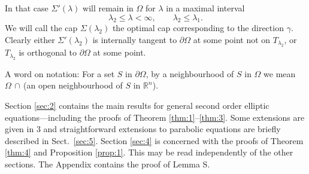 In that case $\Sigma'(\lambda)$ will remain in $\Omega$ for $\lambda$ in a maximal interval
\[\lambda_2\leq\lambda<\infty,\qquad \lambda_2\leq\lambda_1.\]
We will call the cap $\Sigma(\lambda_2)$ the optimal cap corresponding to the direction $\gamma$. 
Clearly either $\Sigma'(\lambda_2)$ is internally tangent to $\partial\Omega$ 
at some point not on $T_{\lambda_2}$, or $T_{\lambda_2}$ is orthogonal to
$\partial\Omega$ at some point.

A word on notation: For a set $S$ in $\partial\Omega$, by a neighbourhood of $S$ in $\Omega$
we mean $\Omega\,\cap$\,(an open neighbourhood of $S$ in $\mathbb{R}^n$).

Section \ref{sec:2} contains the main results for general second order elliptic equations---including the proofs of Theorem \ref{thm:1}--\ref{thm:3}.
Some extensions are given in 3 and straightforward extensions to 
parabolic equations are briefly described in Sect.~\ref{sec:5}. 
Section \ref{sec:4} is concerned with the proofs of Theorem \ref{thm:4}
and Proposition \ref{prop:1}.
This may be read independently of the other sections.
The Appendix contains the proof of Lemma S.